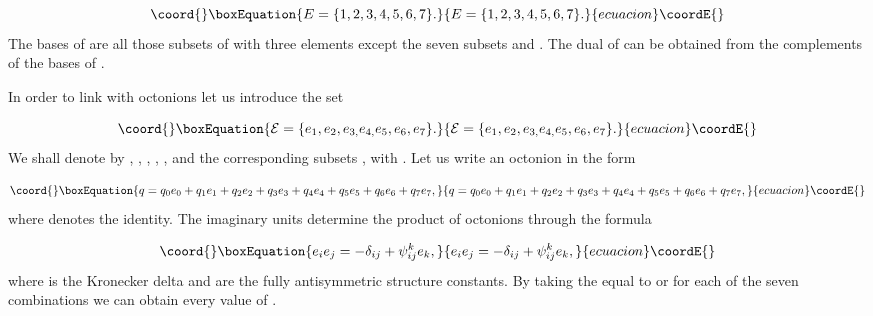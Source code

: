 \documentclass[a4paper,12pt]{article}
\begin{document}
\begin{equation}\coord{}\boxEquation{
E=\{1,2,3,4,5,6,7\}.  \label{8}
}{
E=\{1,2,3,4,5,6,7\}.  }{ecuacion}\coordE{}\end{equation}
The bases of \coordHE{} are all those subsets of \coordHE{} with three elements except
the seven subsets \coordHE{}  \coordHE{}  \coordHE{}  \coordHE{}  \coordHE{}  \coordHE{} and \coordHE{}%
. The dual \coordHE{} of \coordHE{} can be obtained from the complements
of the bases of \coordHE{}.

In order to link \coordHE{} with octonions let us introduce the set

\begin{equation}\coord{}\boxEquation{
\mathcal{E}=\{e_{1},e_{2},e_{3,}e_{4,}e_{5},e_{6},e_{7}\}.  \label{9}
}{
\mathcal{E}=\{e_{1},e_{2},e_{3,}e_{4,}e_{5},e_{6},e_{7}\}.  }{ecuacion}\coordE{}\end{equation}
We shall denote by \coordHE{}, \coordHE{}, \coordHE{}, \coordHE{}, \coordHE{}, \coordHE{} and \coordHE{} the corresponding subsets \coordHE{}, with \coordHE{}. Let us write an octonion in the form

\begin{equation}\coord{}\boxEquation{
q=q_{0}e_{0}+q_{1}e_{1}+q_{2}e_{2}+q_{3}e_{3}+q_{4}e_{4}+q_{5}e_{5}+q_{6}e_{6}
+q_{7}e_{7},
\label{10}
}{
q=q_{0}e_{0}+q_{1}e_{1}+q_{2}e_{2}+q_{3}e_{3}+q_{4}e_{4}+q_{5}e_{5}+q_{6}e_{6}
+q_{7}e_{7},
}{ecuacion}\coordE{}\end{equation}
where \coordHE{} denotes the identity. The imaginary units \coordHE{} determine
the product of octonions through the formula

\begin{equation}\coord{}\boxEquation{
e_{i}e_{j}=-\delta _{ij}+\psi _{ij}^{k}e_{k},  \label{11}
}{
e_{i}e_{j}=-\delta _{ij}+\psi _{ij}^{k}e_{k},  }{ecuacion}\coordE{}\end{equation}
where \coordHE{} is the Kronecker delta and \coordHE{}  \coordHE{} are the fully antisymmetric structure constants. By
taking the \coordHE{} equal to \coordHE{} or \coordHE{} for each of the seven
combinations \coordHE{} we can obtain every value of \coordHE{}.
\end{document}
